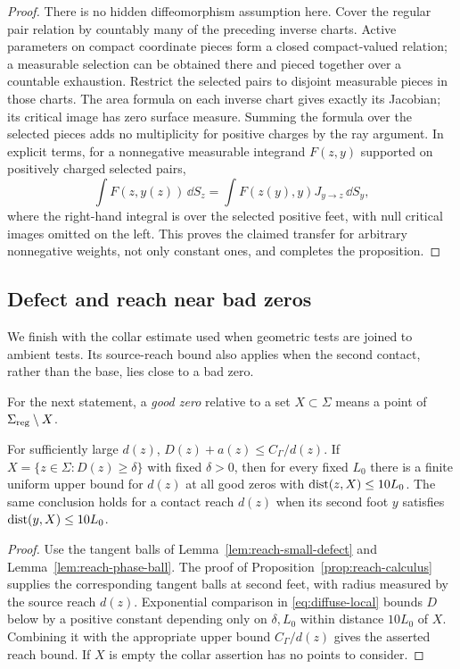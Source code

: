 \begin{proof}
There is no hidden diffeomorphism assumption here.  Cover the regular
pair relation by countably many of the preceding inverse charts.
Active parameters on compact coordinate pieces form a closed
compact-valued relation; a measurable selection can be obtained
there and pieced together over a countable exhaustion.  Restrict the
selected pairs to disjoint measurable pieces in those charts.  The
area formula on each inverse chart gives exactly its Jacobian; its
critical image has zero surface measure.  Summing the formula over
the selected pieces adds no multiplicity for positive charges by
the ray argument.  In explicit terms, for a nonnegative measurable
integrand $F(z,y)$ supported on positively charged selected pairs,
\[
 \int F(z,y(z))\,\dd S_z
 =\int F(z(y),y)J_{y\to z}\,\dd S_y,
\]
where the right-hand integral is over the selected positive feet,
with null critical images omitted on the left.  This proves the
claimed transfer for arbitrary nonnegative weights, not only
constant ones, and completes the proposition.
\end{proof}

\subsection{Defect and reach near bad zeros}

We finish with the collar estimate used when geometric tests are
joined to ambient tests.  Its source-reach bound also applies when
the second contact, rather than the base, lies close to a bad zero.

For the next statement, a \emph{good zero} relative to a set
$X\subset\Sigma$ means a point of $\Sigma_{\rm reg}\setminus X$.

\begin{corollary}\label{cor:reach-base-defect}
For sufficiently large $d(z)$, $D(z)+a(z)\le C_\Gamma/d(z)$.
If $X=\{z\in\Sigma:D(z)\ge\delta\}$ with fixed $\delta>0$, then
for every fixed $L_0$ there is a finite uniform upper bound for $d(z)$
at all good zeros with $\operatorname{dist}(z,X)\le10L_0$.  The same conclusion
holds for a contact reach $d(z)$ when its second foot $y$ satisfies
$\operatorname{dist}(y,X)\le10L_0$.
\end{corollary}

\begin{proof}
Use the tangent balls of Lemma~\ref{lem:reach-small-defect} and
Lemma~\ref{lem:reach-phase-ball}.  The proof of
Proposition~\ref{prop:reach-calculus} supplies the
corresponding tangent balls at second feet, with radius measured by
the source reach $d(z)$.  Exponential comparison in
\eqref{eq:diffuse-local} bounds $D$ below by a positive constant
depending only on $\delta,L_0$ within distance $10L_0$ of $X$.
Combining it with the appropriate upper bound $C_\Gamma/d(z)$
gives the asserted reach bound.  If $X$ is empty the collar assertion
has no points to consider.
\end{proof}
